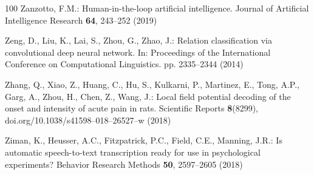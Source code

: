 \documentclass{llmxive}
\begin{document}
\begin{thebibliography}{100}
Zanzotto, F.M.: Human-in-the-loop artificial intelligence. Journal of
  Artificial Intelligence Research  \textbf{64},  243--252 (2019)

Zeng, D., Liu, K., Lai, S., Zhou, G., Zhao, J.: Relation classification via
  convolutional deep neural network. In: Proceedings of the International
  Conference on Computational Linguistics. pp. 2335--2344 (2014)

Zhang, Q., Xiao, Z., Huang, C., Hu, S., Kulkarni, P., Martinez, E., Tong, A.P.,
  Garg, A., Zhou, H., Chen, Z., Wang, J.: Local field potential decoding of the
  onset and intensity of acute pain in rats. Scientific Reports
  \textbf{8}(8299),  doi.org/10.1038/s41598--018--26527--w (2018)

Ziman, K., Heusser, A.C., Fitzpatrick, P.C., Field, C.E., Manning, J.R.: Is
  automatic speech-to-text transcription ready for use in psychological
  experiments? Behavior Research Methods  \textbf{50},  2597--2605 (2018)

\end{thebibliography}
\end{document}

